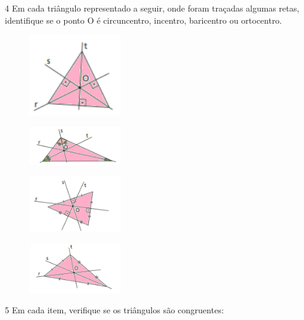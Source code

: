 \pagebreak
\num{4} Em cada triângulo representado a seguir, onde foram traçadas algumas
retas, identifique se o ponto O é circuncentro, incentro, baricentro ou
ortocentro.
\begin{multicols}{2}
\begin{escolha}
\item
\begin{figure}[H]
\centering\includegraphics[width=4cm]{./imgSAEB_8_MAT/media/image15.png}
\end{figure} 
\item
\begin{figure}[H]
\centering\includegraphics[width=4cm]{./imgSAEB_8_MAT/media/image16.png}
\end{figure} 
\item
\begin{figure}[H]
\centering\includegraphics[width=4cm]{./imgSAEB_8_MAT/media/image17.png}
\end{figure} 
\item
\begin{figure}[H]
\centering\includegraphics[width=4cm]{./imgSAEB_8_MAT/media/image18.png}
\end{figure} 
\end{escolha}
\end{multicols}


\num{5} Em cada item, verifique se os triângulos são congruentes:


